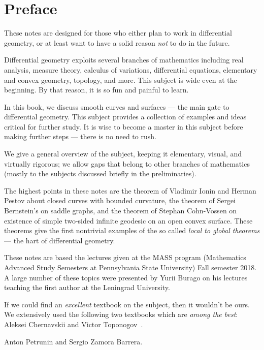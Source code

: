 
\chapter*{Preface}

These notes are designed for those who either plan to work in differential geometry,
or at least want to have a solid reason \emph{not} to do in the future.

Differential geometry exploits several branches of mathematics including 
real analysis, 
measure theory,
calculus of variations,
differential equations,
elementary and convex geometry,
topology, and more.
This subject is wide even at the beginning. 
By that reason, it is so fun and painful to learn.

In this book, we discuss smooth curves and surfaces --- the main gate to differential geometry.
This subject provides a collection of examples and ideas critical for further study.
It is wise to become a master in this subject before making further steps --- there is no need to rush.

We give a general overview of the subject, keeping it elementary, visual, and virtually rigorous; we allow gaps that belong to other branches of mathematics (mostly to the subjects discussed briefly in the preliminaries).

The highest points in these notes are
the theorem of Vladimir Ionin and Herman Pestov about closed curves with bounded curvature,
the theorem of Sergei Bernstein's on saddle graphs,
and the theorem of Stephan Cohn-Vossen on existence of simple two-sided infinite geodesic on an open convex surface.
These theorems give the first nontrivial examples of the so called {}\emph{local to global theorems} --- the hart of differential geometry.

These notes are based the lectures given at the MASS program (Mathematics Advanced Study Semesters at Pennsylvania State University) Fall semester 2018.
A large number of these topics were presented by Yurii Burago on his lectures teaching the first author at the Leningrad University.

If we could find an \emph{excellent} textbook on the subject, then it wouldn't be ours.
We extensively used the following two textbooks which are \emph{among the best}: Aleksei Chernavskii \cite{chernavsky} and Victor Toponogov~\cite{toponogov-book}.

\begin{flushright}
Anton Petrunin and
Sergio Zamora Barrera.
\end{flushright}



\newpage
\tableofcontents
